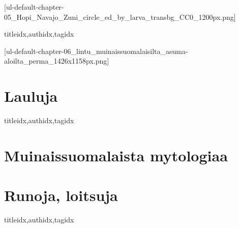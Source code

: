   [ul-default-chapter-05_Hopi_Navajo_Zuni_circle_ed_by_larva_transbg_CC0_1200px.png]
    \begin{ulSongs}{titleidx,authidx,tagidx}
      
    \end{ulSongs}

  [ul-default-chapter-06_lintu_muinaissuomalaisilta_asuma-aloilta_perma_1426x1158px.png]
    \begin{finnish} %
      \section{Lauluja}
        \begin{ulSongs}{titleidx,authidx,tagidx}
          
          
        \end{ulSongs}
      \clearpage\scleardpage
      \section{Muinaissuomalaista mytologiaa}
        
      \clearpage\scleardpage
      \section{Runoja, loitsuja}
        \begin{ulSongs}{titleidx,authidx,tagidx}
          \renewcommand{\ulLyricFont}{\small} %
          
        \end{ulSongs}
    \end{finnish}
